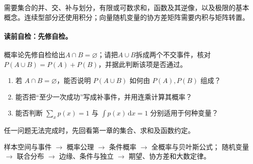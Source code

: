 \label{struct:V1-C04-CH02}
\begin{prerequisitebox}
需要集合的并、交、补与划分，有限或可数求和，函数及其逆像，以及极限的基本概念。连续型部分还使用积分；向量随机变量的协方差矩阵需要内积与矩阵转置。
\end{prerequisitebox}

\label{struct:V1-C04-CH03}
\paragraph{读前自检：先修自检。}概率论先修自检给出$A\cap B=\varnothing$；请把$A\cup B$拆成两个不交事件，核对$P(A\cup B)=P(A)+P(B)$，并据此判断该项是否通过。\par

\begin{precheckbox}
\begin{enumerate}[leftmargin=2.2em]
  \item 若 $A\cap B=\varnothing$，能否说明 $P(A\cup B)$ 如何由 $P(A),P(B)$ 组成？
  \item 能否把“至少一次成功”写成补事件，并用连乘计算其概率？
  \item 能否判断 $\sum_x p(x)=1$ 与 $\int p(x)\,\mathrm dx=1$ 分别适用于何种变量？
\end{enumerate}
任一问题无法完成时，先回看第一章的集合、求和及函数约定。
\end{precheckbox}

\label{struct:V1-C04-CH04}
\begin{dependencybox}
样本空间与事件 $\longrightarrow$ 概率公理 $\longrightarrow$ 条件概率 $\longrightarrow$ 全概率与贝叶斯公式；
随机变量 $\longrightarrow$ 联合分布 $\longrightarrow$ 边缘、条件与独立 $\longrightarrow$ 期望、协方差和大数定律。
\end{dependencybox}

